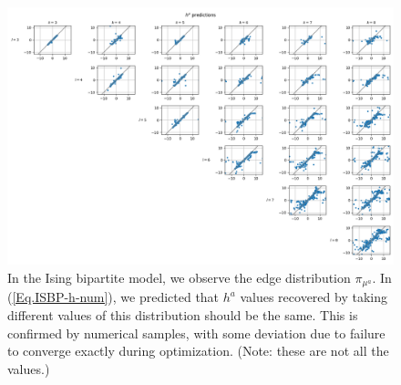\documentclass[12pt]{article}
\numberwithin{equation}{section}
\begin{document}
\begin{figure}[h]
    \centering
    \includegraphics[width=16cm]{img/Ising_bptt/ha_pred.png}
    \caption{In the Ising bipartite model, we observe the edge distribution $\pi_{\mu^a}$. In (\ref{Eq.ISBP-h-num}), we predicted that $h^a$ values
        recovered by taking different values of this distribution should be the same. This is confirmed by numerical samples, with some
        deviation due to failure to converge exactly during optimization. (Note: these are not all the values.)}
    \label{Fig.ISBP-ha-guess}
\end{figure}

\newpage
\end{document}
